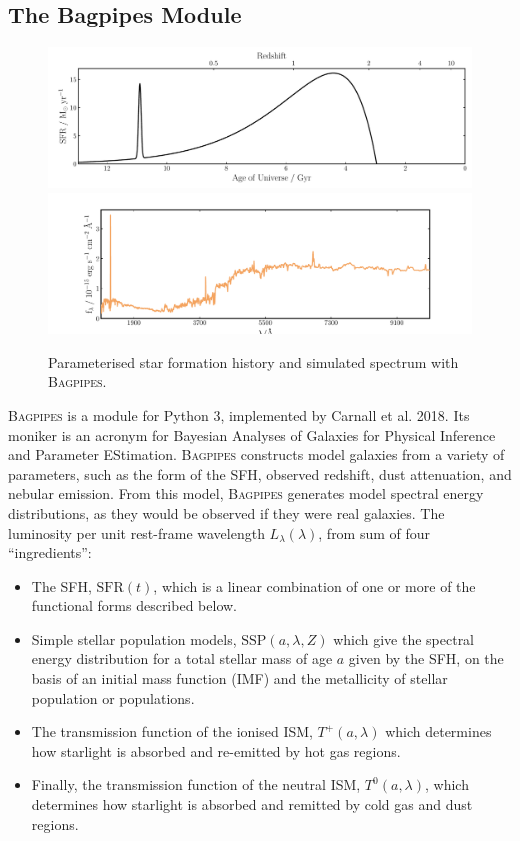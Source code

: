 \documentclass[a4paper,11pt]{article}
\begin{document}
\subsection{The Bagpipes Module}\label{sec:bagpipes_module}

\begin{figure}[H]
  \includegraphics[width=\textwidth]{alex_model_20_sfh}
  \includegraphics[width=\textwidth]{alex_model_20_spec}
  \caption{Parameterised star formation history and simulated spectrum with \textsc{Bagpipes}.}
  \label{fig:bagpipes_example_simulation}
\end{figure}

\textsc{Bagpipes} is a module for Python 3, implemented by Carnall et al. 2018. Its moniker is an acronym for Bayesian Analyses of Galaxies for Physical Inference and Parameter EStimation. \textsc{Bagpipes} constructs model galaxies from a variety of parameters, such as the form of the SFH, observed redshift, dust attenuation, and nebular emission. From this model, \textsc{Bagpipes} generates model spectral energy distributions, as they would be observed if they were real galaxies. The luminosity per unit rest-frame wavelength $L_\lambda(\lambda)$, from sum of four ``ingredients'':

\begin{itemize}
  \item The SFH, $\mathrm{SFR}(t)$, which is a linear combination of one or more of the functional forms described below.
  \item Simple stellar population models, $\mathrm{SSP}(a,\lambda,Z)$ which give the spectral energy distribution for a total stellar mass of age $a$ given by the SFH, on the basis of an initial mass function (IMF) and the metallicity of stellar population or populations.
  \item The transmission function of the ionised ISM, $T^+(a,\lambda)$ which determines how starlight is absorbed and re-emitted by hot gas regions.
  \item Finally, the transmission function of the neutral ISM, $T^0(a,\lambda)$, which determines how starlight is absorbed and remitted by cold gas and dust regions.\cite{Carnall_2018}
\end{itemize}
\end{document}
